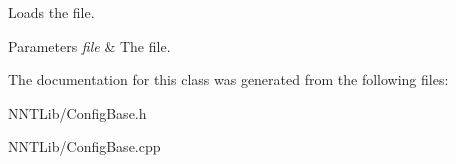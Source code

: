 Loads the file. 


\begin{DoxyParams}{Parameters}
{\em file} & The file.\\
\hline
\end{DoxyParams}


The documentation for this class was generated from the following files\+:\begin{DoxyCompactItemize}
\item 
N\+N\+T\+Lib/Config\+Base.\+h\item 
N\+N\+T\+Lib/Config\+Base.\+cpp\end{DoxyCompactItemize}
